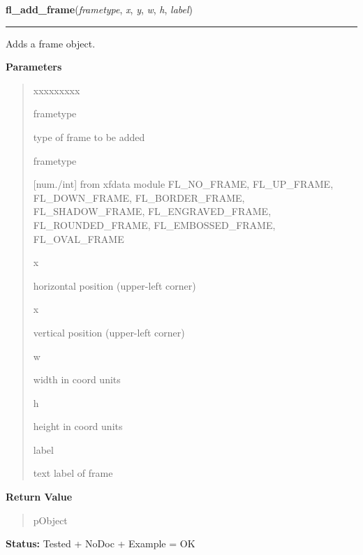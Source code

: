\hspace{.8\funcindent}\begin{boxedminipage}{\funcwidth}

    \raggedright \textbf{fl\_add\_frame}(\textit{frametype}, \textit{x}, \textit{y}, \textit{w}, \textit{h}, \textit{label})

    \vspace{-1.5ex}

    \rule{\textwidth}{0.5\fboxrule}
\setlength{\parskip}{2ex}
    Adds a frame object.

\setlength{\parskip}{1ex}
      \textbf{Parameters}
      \vspace{-1ex}

      \begin{quote}
        \begin{Ventry}{xxxxxxxxx}

          \item[frametype]

          type of frame to be added

          \item[frametype]

          [num./int] from xfdata module FL\_NO\_FRAME, FL\_UP\_FRAME, 
          FL\_DOWN\_FRAME, FL\_BORDER\_FRAME, FL\_SHADOW\_FRAME, 
          FL\_ENGRAVED\_FRAME, FL\_ROUNDED\_FRAME, FL\_EMBOSSED\_FRAME, 
          FL\_OVAL\_FRAME

          \item[x]

          horizontal position (upper-left corner)

          \item[x]

          vertical position (upper-left corner)

          \item[w]

          width in coord units

          \item[h]

          height in coord units

          \item[label]

          text label of frame

        \end{Ventry}

      \end{quote}

      \textbf{Return Value}
    \vspace{-1ex}

      \begin{quote}
      pObject

      \end{quote}

\textbf{Status:} Tested + NoDoc + Example = OK



    \end{boxedminipage}

